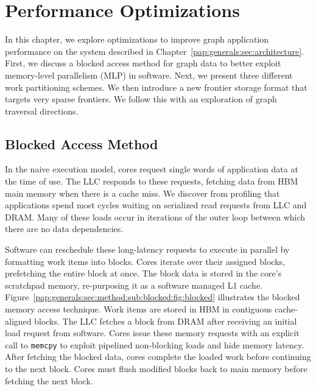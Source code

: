 \chapter{Performance Optimizations}\label{gen:sec:optimizations}



In this chapter, we explore optimizations to improve graph application performance on the \hbmc system described in Chapter~\ref{pap:generals:sec:architecture}.
First, we discuss a blocked access method for graph data to better exploit memory-level parallelism (MLP) in software.
Next, we present three different work partitioning schemes.
We then introduce a new frontier storage format that targets very sparse frontiers. 
We follow this with an exploration of graph traversal directions.

\section{Blocked Access Method}\label{sec:method:sub:blocked}
In the naive execution model, cores request single words of application data at the time of use.
The LLC responds to these requests, fetching data from HBM main memory when there is a cache miss.
We discover from profiling that applications spend most cycles waiting on serialized read requests from LLC and DRAM.
Many of these loads occur in iterations of the outer loop between which there are no data dependencies.

\blockedMethodFigure

Software can reschedule these long-latency requests to execute in parallel by formatting work items into blocks.
Cores iterate over their assigned blocks, prefetching the entire block at once.
The block data is stored in the core's scratchpad memory, re-purposing it as a software managed L1 cache.
Figure~\ref{pap:generals:sec:method:sub:blocked:fig:blocked} illustrates the blocked memory access technique. 
Work items are stored in HBM in contiguous cache-aligned blocks.
The LLC fetches a block from DRAM after receiving an initial load request from software.
Cores issue these memory requests with an explicit call to \lstinline[language=C++, basicstyle=\small\ttfamily]{memcpy} to exploit pipelined non-blocking loads and hide memory latency.
After fetching the blocked data, cores complete the loaded work before continuing to the next block.
Cores must flush modified blocks back to main memory before fetching the next block.

